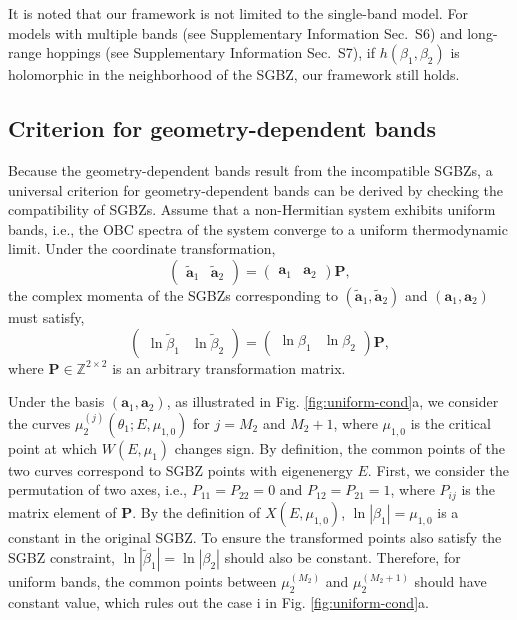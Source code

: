 It is noted that our framework is not limited to the single-band model. For models with multiple bands (see Supplementary Information Sec.~S6) and long-range hoppings (see Supplementary Information Sec.~S7), if $h(\beta_1,\beta_2)$ is holomorphic in the neighborhood of the SGBZ, our framework still holds.


\subsection{Criterion for geometry-dependent bands}

Because the geometry-dependent bands result from the incompatible
SGBZs, a universal criterion for geometry-dependent bands can be derived
by checking the compatibility of SGBZs. Assume that a non-Hermitian
system exhibits uniform bands, i.e., the OBC spectra of the system
converge to a uniform thermodynamic limit. Under the coordinate transformation,
\begin{equation}
\begin{pmatrix}\tilde{\mathbf{a}}_{1} & \tilde{\mathbf{a}}_{2}\end{pmatrix}=\begin{pmatrix}\mathbf{a}_{1} & \mathbf{a}_{2}\end{pmatrix}\mathbf{P},
\end{equation}
the complex momenta of the SGBZs corresponding to $(\tilde{\mathbf{a}}_{1},\tilde{\mathbf{a}}_{2})$
and $(\mathbf{a}_{1},\mathbf{a}_{2})$ must satisfy, 
\begin{equation}
\begin{pmatrix}\ln\tilde{\beta}_{1} & \ln\tilde{\beta}_{2}\end{pmatrix}=\begin{pmatrix}\ln\beta_{1} & \ln\beta_{2}\end{pmatrix}\mathbf{P},\label{eq:trans-beta}
\end{equation}
where $\mathbf{P}\in\mathbb{Z}^{2\times2}$ is an arbitrary transformation
matrix.

Under the basis $(\mathbf{a}_{1},\mathbf{a}_{2})$, as illustrated
in Fig. \ref{fig:uniform-cond}a, we consider the curves $\mu_{2}^{(j)}(\theta_{1};E,\mu_{1,0})$
for $j=M_{2}$ and $M_{2}+1$, where $\mu_{1,0}$ is the critical
point at which $W(E,\mu_{1})$ changes sign. By definition, the common
points of the two curves correspond to SGBZ points with eigenenergy
$E$. First, we consider the permutation of two axes, i.e., $P_{11}=P_{22}=0$
and $P_{12}=P_{21}=1$, where $P_{ij}$ is the matrix element of $\mathbf{P}$.
By the definition of $X(E,\mu_{1,0})$, $\ln|\beta_{1}|=\mu_{1,0}$
is a constant in the original SGBZ. To ensure the transformed points
also satisfy the SGBZ constraint, $\ln|\tilde{\beta}_{1}|=\ln|\beta_{2}|$
should also be constant. Therefore, for uniform bands, the common
points between $\mu_{2}^{(M_{2})}$ and $\mu_{2}^{(M_{2}+1)}$ should
have constant value, which rules out the case i in Fig. \ref{fig:uniform-cond}a.

